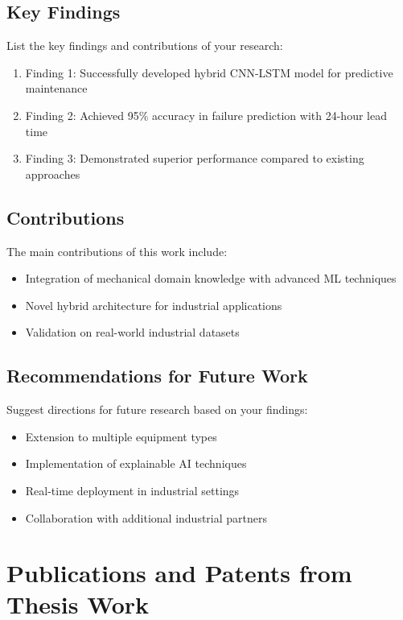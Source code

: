 \documentclass[12pt,a4paper]{report}
\begin{document}
\section{Key Findings}
List the key findings and contributions of your research:

\begin{enumerate}
\item Finding 1: Successfully developed hybrid CNN-LSTM model for predictive maintenance
\item Finding 2: Achieved 95\% accuracy in failure prediction with 24-hour lead time
\item Finding 3: Demonstrated superior performance compared to existing approaches
\end{enumerate}

\section{Contributions}
The main contributions of this work include:

\begin{itemize}
\item Integration of mechanical domain knowledge with advanced ML techniques
\item Novel hybrid architecture for industrial applications
\item Validation on real-world industrial datasets
\end{itemize}

\section{Recommendations for Future Work}
Suggest directions for future research based on your findings:

\begin{itemize}
\item Extension to multiple equipment types
\item Implementation of explainable AI techniques
\item Real-time deployment in industrial settings
\item Collaboration with additional industrial partners
\end{itemize}

\chapter{Publications and Patents from Thesis Work}
\label{ch:publications}
\end{document}
